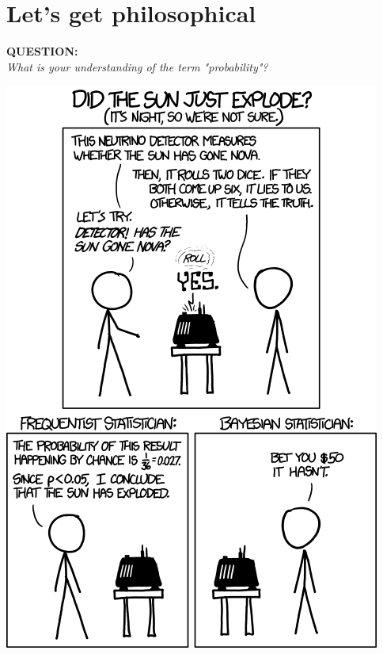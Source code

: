 \documentclass[a4,11pt]{beamer}
\begin{document}
\section{Let's get philosophical}
\begin{frame}{}
    \begin{center}
        \textcolor{blueberry}{\textbf{\Large{QUESTION:}}}\bigskip\\

        \emph{\Large What is your understanding of the term "probability"?}
    \end{center}
\end{frame}
\begin{frame}{}
\begin{center}
        \includegraphics[height=.9\paperheight]{graphics/frequentists_vs_bayesians.png}
\end{center}
\end{frame}
\end{document}
